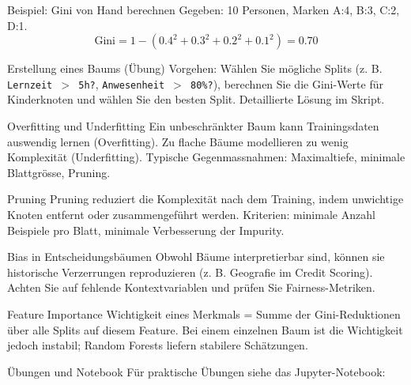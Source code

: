 \begin{frame}{Beispiel: Gini von Hand berechnen}
    Gegeben: 10 Personen, Marken A:4, B:3, C:2, D:1.
    \[   \mathrm{Gini} = 1 - (0.4^2 + 0.3^2 + 0.2^2 + 0.1^2) = 0.70    \]
\end{frame}

\begin{frame}[fragile]{Erstellung eines Baums (Übung)}
    Vorgehen: Wählen Sie mögliche Splits (z. B. \texttt{Lernzeit $>$ 5h?}, \texttt{Anwesenheit $>$ 80\%?}), berechnen Sie die Gini-Werte für Kinderknoten und wählen Sie den besten Split. Detaillierte Lösung im Skript.
\end{frame}

\begin{frame}{Overfitting und Underfitting}
    Ein unbeschränkter Baum kann Trainingsdaten auswendig lernen (Overfitting). Zu flache Bäume modellieren zu wenig Komplexität (Underfitting). Typische Gegenmassnahmen: Maximaltiefe, minimale Blattgrösse, Pruning.
\end{frame}

\begin{frame}{Pruning}
    Pruning reduziert die Komplexität nach dem Training, indem unwichtige Knoten entfernt oder zusammengeführt werden. Kriterien: minimale Anzahl Beispiele pro Blatt, minimale Verbesserung der Impurity.
\end{frame}

\begin{frame}{Bias in Entscheidungsbäumen}
    Obwohl Bäume interpretierbar sind, können sie historische Verzerrungen reproduzieren (z. B. Geografie im Credit Scoring). Achten Sie auf fehlende Kontextvariablen und prüfen Sie Fairness-Metriken.
\end{frame}

\begin{frame}{Feature Importance}
    Wichtigkeit eines Merkmals = Summe der Gini-Reduktionen über alle Splits auf diesem Feature. Bei einem einzelnen Baum ist die Wichtigkeit jedoch instabil; Random Forests liefern stabilere Schätzungen.
\end{frame}

\begin{frame}{Übungen und Notebook}
    Für praktische Übungen siehe das Jupyter-Notebook: %
\end{frame}

